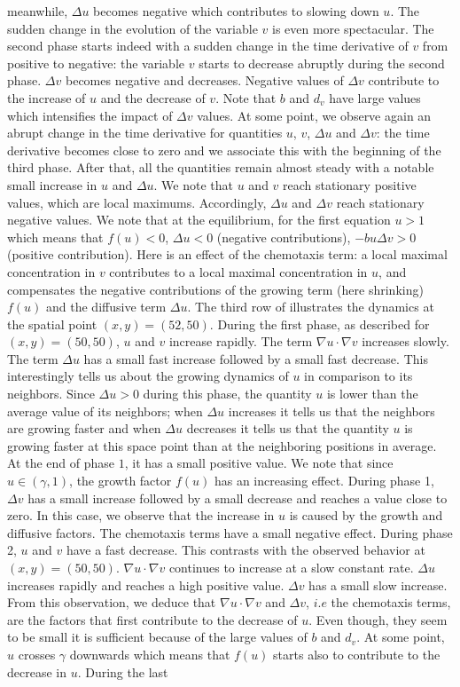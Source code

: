 \documentclass[final,1p,times]{elsarticle}
\begin{document}
meanwhile, $\Delta  u$ becomes negative which contributes to slowing down $u$. The sudden change in the evolution of the variable $v$ is even more spectacular. The second phase starts indeed with a sudden change in the time derivative of $v$ from positive to negative: the variable $v$ starts to decrease abruptly during the second phase.  $\Delta v$ becomes negative and decreases. Negative values of $\Delta v$ contribute to the increase of $u$ and the decrease of $v$. Note that $b$ and $d_v$ have large values which intensifies the impact of $\Delta v$ values. At some point, we observe again an abrupt change in the time derivative for quantities $u$, $v$, $\Delta u$ and $\Delta v$: the time derivative becomes close to zero and we associate this with the beginning of the third phase. After that, all the quantities remain almost steady with a notable small increase in $u$ and $\Delta u$.  We note that $u$ and $v$ reach stationary positive values, which are local maximums. Accordingly, $\Delta u$ and $\Delta v$ reach stationary negative values. We note that at the equilibrium, for the first equation $u>1$ which means that $f(u)<0$, $\Delta u<0$ (negative contributions), $-bu\Delta v>0$ (positive contribution). Here is an effect of the chemotaxis term: a local maximal concentration in $v$ contributes to a local maximal concentration in $u$, and compensates the negative contributions of the growing term (here shrinking) $f(u)$ and the diffusive term $\Delta u$. The third row of  illustrates the dynamics at the spatial point $(x,y)=(52,50)$.  During the first phase, as described for $(x,y)=(50,50)$, $u$ and $v$ increase rapidly. The term $\nabla u \cdot \nabla v$ increases slowly. The term $\Delta  u$ has a small fast increase followed by a small fast decrease. This interestingly tells us about the growing dynamics of $u$ in comparison to its neighbors. Since $\Delta u>0$ during this phase, the quantity $u$ is lower than the average value of its neighbors; when $\Delta u$ increases it tells us that the neighbors are growing faster and when $\Delta u$ decreases it tells us that the quantity $u$ is growing faster at this space point than at the neighboring positions in average. At the end of phase $1$, it has a small positive value. We note that since $u\in (\gamma, 1)$, the growth factor $f(u)$ has an increasing effect. During phase 1, $\Delta v$ has a small increase followed by a small decrease and reaches a value close to zero.  In this case, we observe that the increase in $u$ is caused by the growth and diffusive factors. The chemotaxis terms have a small negative effect.  During phase 2, $u$ and $v$ have a fast decrease. This contrasts with the observed behavior at $(x,y)=(50,50)$. $\nabla u \cdot \nabla v$ continues to increase at a slow constant rate.   $\Delta  u$ increases rapidly and reaches a high positive value. $\Delta v$ has a small slow increase. From this observation, we deduce that $\nabla u \cdot \nabla v$ and $\Delta v$, $i.e$ the chemotaxis terms, are the factors that first contribute to the decrease of $u$. Even though, they seem to be small it is sufficient  because of the large values of $b$ and $d_v$. At some point, $u$ crosses $\gamma$ downwards which means that $f(u)$ starts also to contribute to the decrease in $u$.   During the last 
\end{document}
